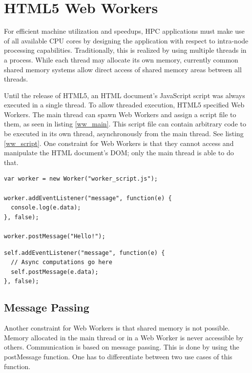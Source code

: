\section{HTML5 Web Workers} \label{chapter_webworkers}

For efficient machine utilization and speedups, HPC applications must make use of all available CPU cores by designing the application with respect to intra-node processing capabilities. Traditionally, this is realized by using multiple threads in a process. While each thread may allocate its own memory, currently common shared memory systems allow direct access of shared memory areas between all threads. 

Until the release of HTML5, an HTML document's JavaScript script was always executed in a single thread. To allow threaded execution, HTML5 specified Web Workers. The main thread can spawn Web Workers and assign a script file to them, as seen in listing \ref{ww_main}. This script file can contain arbitrary code to be executed in its own thread, asynchronously from the main thread. See listing \ref{ww_script}. One constraint for Web Workers is that they cannot access and manipulate the HTML document's DOM; only the main thread is able to do that.

\begin{lstlisting}[frame=single,basicstyle=\footnotesize]
var worker = new Worker("worker_script.js");

worker.addEventListener("message", function(e) {
  console.log(e.data);
}, false);

worker.postMessage("Hello!");
\end{lstlisting}

\begin{lstlisting}[frame=single,basicstyle=\footnotesize]
self.addEventListener("message", function(e) {
  // Async computations go here
  self.postMessage(e.data);
}, false);
\end{lstlisting}


\subsection{Message Passing}

Another constraint for Web Workers is that shared memory is not possible. Memory allocated in the main thread or in a Web Worker is never accessible by others. Communication is based on message passing. This is done by using the postMessage function. One has to differentiate between two use cases of this function.

